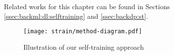 Related works for this chapter can be found in Sections \ref{ssec:backml:dl:selftraining} and \ref{ssec:backdp:st}.

\begin{figure}
  \centering
  \texttt{[image: strain/method-diagram.pdf]}
  \caption{Illustration of our self-training approach}
  \label{fig:strain:method_diagram}
\end{figure}





